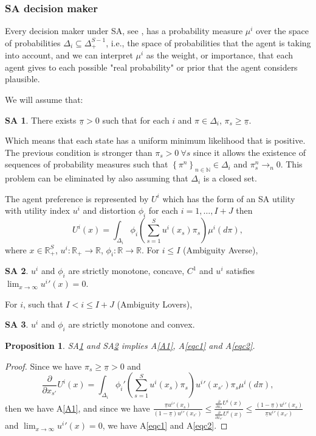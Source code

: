 \documentclass[pdftex]{article}
\numberwithin{equation}{section}
\theoremstyle{th}
\newtheorem{prop}{{Proposition}}%
\newtheorem{proof lemma}{{Proof Lemma}.}
\theoremstyle{definition}
\newtheorem{SA}{SA\hspace{-0.15cm}}
\newtheorem*{risk lovers}{Risk lovers}
\newtheorem*{risk averse}{Risk averse}
\begin{document}
\subsubsection{SA decision maker}

Every decision maker under SA, see \cite{KMM}, has a probability measure $\mu^i$ over the space of probabilities $\Delta_i\subseteq\Delta_+^{S-1}$, i.e., the space of probabilities that the agent is taking into account, and we can interpret $\mu^i$ as the weight, or importance, that each agent gives to each possible "real probability" or prior that the agent considers plausible.

We will assume that:
\begin{SA}\label{SA1}There exists $\underline{\pi}>0$ such that for each $i$ and $\pi\in\Delta_i$, $\pi_s\geq\underline{\pi}$. \end{SA}Which means that each state has a uniform minimum likelihood that is positive. %
The previous condition is stronger than $\pi_s>0\ \forall{s}$ since it allows the existence of sequences of probability measures such that $\left\{\pi^n\right\}_{n\in\mathbb{N}}\in\Delta_i$ and $\pi_s^n\rightarrow_n0$. This problem can be eliminated by also assuming that $\Delta_i$ is a closed set.

The agent preference is represented by  $U^i$ which has the form of an SA utility with utility index ${u^i}$ and distortion $\phi_i$ for each $i=1,\dots,I+J$ then
\[
U^i(x)=\int_{\Delta_i}\phi_i\left(\sum_{s=1}^S{u^i}\left(x_s\right)\pi_s\right)\mu^i(d\pi),
\]
where $x\in\mathbb{R}_+^S$, ${u^i}:\mathbb{R}_+\rightarrow\mathbb{R}$, $\phi_i:\mathbb{R}\rightarrow\mathbb{R}$. For $i\leq{I}$ (Ambiguity Averse), \begin{SA}\label{SA2}${u^i}$ and $\phi_i$ are strictly monotone, concave, $C^1$ and ${u^i}$ satisfies $\lim_{x\rightarrow\infty}{u^i}'(x)=0$.\end{SA} For $i$, such that $I<i\leq{I}+J$ (Ambiguity Lovers), \begin{SA}\label{SA3}${u^i}$ and $\phi_i$ are strictly monotone and convex.\end{SA}

\begin{prop}
SA\ref{SA1} and SA\ref{SA2} implies A\ref{A1}, A\ref{eqc1} and A\ref{eqc2}.
\end{prop}
\begin{proof}
Since we have $\pi_s\geq\underline{\pi}>0$ and\[\frac{\partial}{\partial{x_{s'}}}{U^i}(x)=\int_{\Delta_i}\phi_i'\left(\sum_{s=1}^S{u^i}\left(x_s\right)\pi_s\right){u^i}'\left(x_{s'}\right)\pi_s\mu^i(d\pi),\]
then we have A\ref{A1}, and since we have $\frac{\underline{\pi}{u^i}'\!\!\left(x_{s}\right)}{\left(1-\underline{\pi}\right){u^i}'\!\!\left(x_{s'}\right)}\leq\frac{\frac{\partial}{\partial{x_{s}}}{U^i}(x)}{\frac{\partial}{\partial{x_{s'}}}{U^i}(x)}\leq\frac{\left(1-\underline{\pi}\right){u^i}'\!\!\left(x_{s}\right)}{\underline{\pi}{u^i}'\!\!\left(x_{s'}\right)}$ and $\lim_{x\rightarrow\infty}{u^i}'(x)=0$, we have A\ref{eqc1} and A\ref{eqc2}.
\end{proof}
\end{document}
